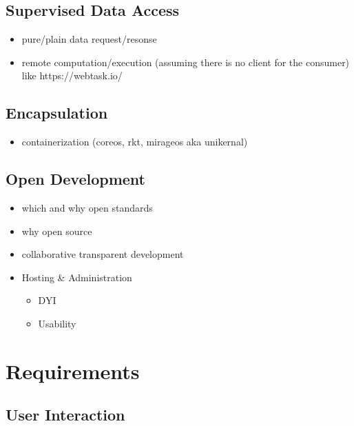 \documentclass[12pt,english,a4paper,titlepage,cleardoublepage=empty,dottedtoc]{report}
\providecommand{\tightlist}{%
  \setlength{\itemsep}{0pt}\setlength{\parskip}{0pt}}
\begin{document}
\section{Supervised Data Access}\label{supervised-data-access}

\begin{itemize}
\tightlist
\item
  pure/plain data request/resonse
\item
  remote computation/execution (assuming there is no client for the
  consumer) like https://webtask.io/
\end{itemize}

\section{Encapsulation}\label{encapsulation}

\begin{itemize}
\tightlist
\item
  containerization (coreos, rkt, mirageos aka unikernal)
\end{itemize}

\section{Open Development}\label{open-development}

\begin{itemize}
\item
  which and why open standards
\item
  why open source
\item
  collaborative transparent development
\item
  Hosting \& Administration

  \begin{itemize}
  \tightlist
  \item
    DYI
  \item
    Usability
  \end{itemize}
\end{itemize}

\chapter{Requirements}\label{requirements}

\section{User Interaction}\label{user-interaction}
\end{document}
